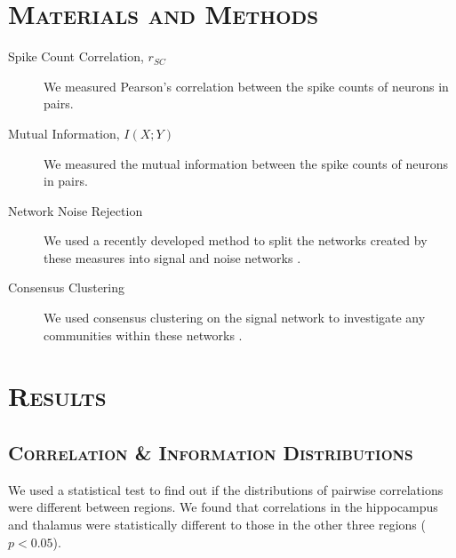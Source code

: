 \documentclass[a0,portrait]{a0poster}
\begin{document}
\begin{multicols}{2}


\section*{\color{NavyBlue}\textsc{Materials and Methods}\color{Black}}

\begin{description}
  \item[Spike Count Correlation, $r_{SC}$] We measured Pearson's correlation between the spike counts of neurons in pairs.
  \item[Mutual Information, $I(X;Y)$] We measured the mutual information between the spike counts of neurons in pairs.
  \item[Network Noise Rejection] We used a recently developed method to split the networks created by these measures into signal and noise networks \cite{humphries}.
  \item[Consensus Clustering] We used consensus clustering on the signal network to investigate any communities within these networks \cite{humphries}.
\end{description}


\section*{\color{NavyBlue}\textsc{Results}\color{Black}}

\subsection*{\color{NavyBlue}\textsc{Correlation \& Information Distributions}\color{Black}}

We used a statistical test to find out if the distributions of pairwise correlations were different between regions. We found that correlations in the hippocampus and thalamus were statistically different to those in the other three regions ($p < 0.05$).


\end{multicols}
\end{document}
